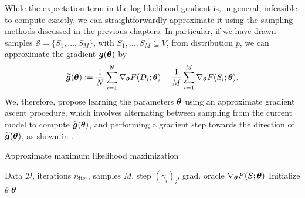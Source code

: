While the expectation term in the log-likelihood gradient is, in general, infeasible to compute exactly, we can straightforwardly approximate it using the sampling methods discussed in the previous chapters.
In particular, if we have drawn samples $\mathcal{S} = \{ S_1,\ldots,S_M \}$, with $S_1,\ldots,S_M \subseteq V$, from distribution $p$, we can approximate the gradient $\bm{g}(\bm{\theta})$ by
\begin{align*}
\widetilde{\bm{g}}(\bm{\theta}) \vcentcolon= \frac{1}{N}\sum_{i=1}^N \nabla_{\bm{\theta}} F(D_i; \bm{\theta}) - \frac{1}{M}\sum_{i=1}^M \nabla_{\bm{\theta}} F(S_i; \bm{\theta}).
\end{align*}
We, therefore, propose learning the parameters $\bm{\theta}$ using an approximate gradient ascent procedure, which involves alternating between sampling from the current model to compute $\widetilde{\bm{g}}(\bm{\theta})$, and performing a gradient step towards the direction of $\widetilde{\bm{g}}(\bm{\theta})$, as shown in .

\begin{algorithm}[tb]
  \caption{Approximate maximum likelihood maximization}
  \label{alg:grad}
    \begin{algorithmic}[1]
      \REQUIRE Data $\mathcal{D}$, iterations $n_{\mathrm{iter}}$, samples $M$, step $(\gamma_i)_i$, grad. oracle $\nabla_{\bm{\theta}} F(S; \bm{\theta})$
      \STATE Initialize $\theta$
      \ENDFOR
      \RETURN $\bm{\theta}$
    \end{algorithmic}
\end{algorithm}


